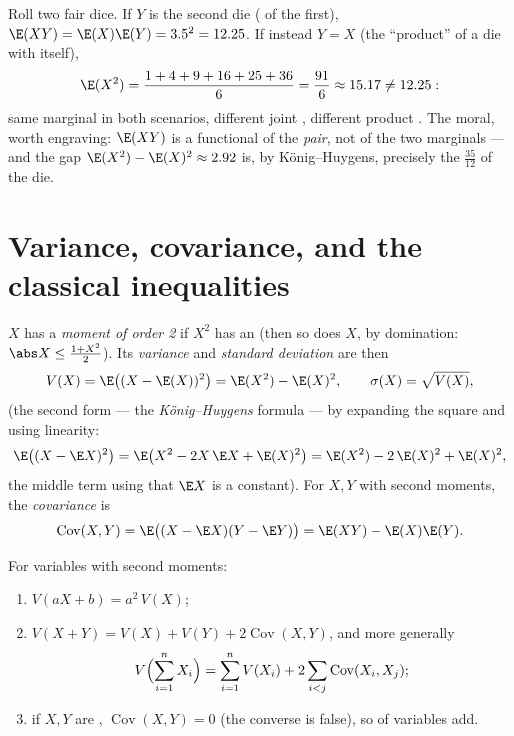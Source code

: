 \begin{example}\label{ex:b2:randomvar:productcontrast}
Roll two fair dice. If $Y$ is the second die ( of
the first), $\E(XY) = \E(X)\E(Y) = 3.5^2 = 12.25$. If instead
$Y = X$ (the ``product'' of a die with itself),
\[
\E(X^2) = \frac{1 + 4 + 9 + 16 + 25 + 36}{6} = \frac{91}{6}
\approx 15.17 \neq 12.25 :
\]
same marginal  in both scenarios, different joint ,
different product . The moral, worth engraving:
$\E(XY)$ is a functional of the \emph{pair}, not of the two
marginals --- and the gap $\E(X^2) - \E(X)^2 \approx 2.92$
is, by K\"onig--Huygens, precisely the 
$\frac{35}{12}$ of the die.
\end{example}

\section{Variance, covariance, and the classical inequalities}

\begin{definition}\label{def:b2:randomvar:variance}
$X$ has a \emph{moment of order 2} if $X^2$ has an 
(then so does $X$, by domination: $\abs X \leq \frac{1 +
X^2}{2}$). Its \emph{variance} and \emph{standard
deviation} are
then
\[
V(X) = \E\bigl((X - \E(X))^2\bigr)
= \E(X^2) - \E(X)^2 ,
\qquad
\sigma(X) = \sqrt{V(X)} ,
\]
(the second form --- the \emph{K\"onig--Huygens} formula --- by
expanding the square and using linearity:
\[
\E\bigl((X - \E X)^2\bigr)
= \E\bigl(X^2 - 2X\,\E X + \E(X)^2\bigr)
= \E(X^2) - 2\,\E(X)^2 + \E(X)^2 ,
\]
the middle term using that $\E X$ is a constant). For $X, Y$ with second moments,
the \emph{covariance} is
\[
\operatorname{Cov}(X, Y)
= \E\bigl((X - \E X)(Y - \E Y)\bigr)
= \E(XY) - \E(X)\E(Y) .
\]
\end{definition}

\begin{theorem}\label{thm:b2:randomvar:variancerules}
For variables with second moments:
\begin{enumerate}
\item $V(aX + b) = a^2\,V(X)$;
\item $V(X + Y) = V(X) + V(Y) + 2\operatorname{Cov}(X, Y)$, and
more generally
\[
V\Bigl(\sum_{i=1}^n X_i\Bigr)
= \sum_{i=1}^n V(X_i)
+ 2\sum_{i < j}\operatorname{Cov}(X_i, X_j) ;
\]
\item if $X, Y$ are , $\operatorname{Cov}(X, Y) = 0$
(the converse is false), so  of  variables
add.
\end{enumerate}
\end{theorem}

